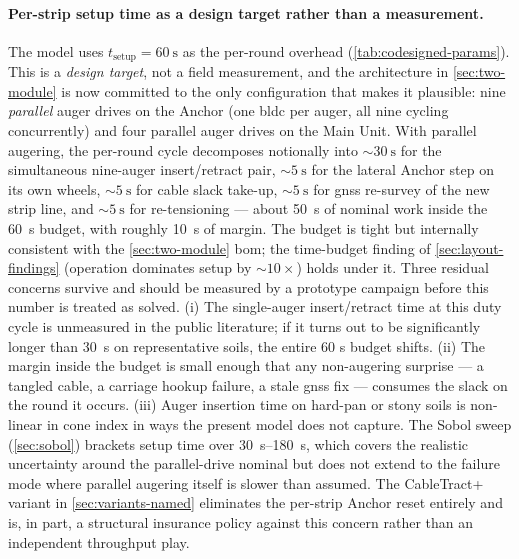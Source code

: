 \documentclass[11pt,a4paper]{article}
\begin{document}
\paragraph{Per-strip setup time as a design target rather than a measurement.} The model uses $t_{\text{setup}} = \SI{60}{\second}$ as the per-round overhead (\cref{tab:codesigned-params}). This is a \emph{design target}, not a field measurement, and the architecture in \cref{sec:two-module} is now committed to the only configuration that makes it plausible: nine \emph{parallel} auger drives on the Anchor (one \gls{bldc} per auger, all nine cycling concurrently) and four parallel auger drives on the Main Unit. With parallel augering, the per-round cycle decomposes notionally into ${\sim}\SI{30}{\second}$ for the simultaneous nine-auger insert/retract pair, ${\sim}\SI{5}{\second}$ for the lateral Anchor step on its own wheels, ${\sim}\SI{5}{\second}$ for cable slack take-up, ${\sim}\SI{5}{\second}$ for \gls{gnss} re-survey of the new strip line, and ${\sim}\SI{5}{\second}$ for re-tensioning --- about \SI{50}{\second} of nominal work inside the \SI{60}{\second} budget, with roughly \SI{10}{\second} of margin. The budget is tight but internally consistent with the \cref{sec:two-module} \gls{bom}; the time-budget finding of \cref{sec:layout-findings} (operation dominates setup by ${\sim}10\times$) holds under it. Three residual concerns survive and should be measured by a prototype campaign before this number is treated as solved. (i) The single-auger insert/retract time at this duty cycle is unmeasured in the public literature; if it turns out to be significantly longer than \SI{30}{\second} on representative soils, the entire 60 s budget shifts. (ii) The margin inside the budget is small enough that any non-augering surprise --- a tangled cable, a carriage hookup failure, a stale \gls{gnss} fix --- consumes the slack on the round it occurs. (iii) Auger insertion time on hard-pan or stony soils is non-linear in cone index in ways the present model does not capture. The Sobol sweep (\cref{sec:sobol}) brackets setup time over \SIrange{30}{180}{\second}, which covers the realistic uncertainty around the parallel-drive nominal but does not extend to the failure mode where parallel augering itself is slower than assumed. The CableTract+ variant in \cref{sec:variants-named} eliminates the per-strip Anchor reset entirely and is, in part, a structural insurance policy against this concern rather than an independent throughput play.
\end{document}
